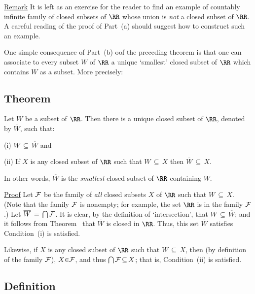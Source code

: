 {\V

        \underline{Remark} It is left as an exercise for the reader to find an example of countably infinite family of closed subsets of ${\RR}$ whose union is {\em not} a closed subset of ${\RR}$.
    A careful reading of the proof of Part~(a) should suggest how to construct such an example.

\V
\V

        One simple consequence of Part~(b) oof the preceding theorem is that one can associate to every subset $W$ of ${\RR}$ a unique `smallest' closed subset of ${\RR}$ which contains $W$ as a subset.
    More precisely:

            \subsection{\small{\bf Theorem}}
            \label{ThmC80.50}

        Let $W$ be a subset of ${\RR}$. Then there is a unique closed subset of ${\RR}$, denoted by $\overline{W}$, such that:

        (i) $W \,{\subseteq}\, \overline{W}$ and

        (ii) If $X$ is any closed subset of ${\RR}$ such that $W \,{\subseteq}\, X$ then $\overline{W} \,{\subseteq}\, X$.

\noindent In other words, $\overline{W}$ is the {\em smallest} closed subset of ${\RR}$ containing $W$.

\V

        \underline{Proof} Let ${\cal F}$ be the family of {\em all} closed subsets $X$ of ${\RR}$ such that $W \,{\subseteq}\, X$.
    (Note that the family ${\cal F}$ is nonempty; for example, the set ${\RR}$ is in the family ${\cal F}$.)
    Let $\overline{W} \,=\, {\bigcap}\, {\cal F}$. It is clear, by the definition of `intersection', that $W \,{\subseteq}\, {\overline{W}}$;
     and it follows from Theorem~ that $\overline{W}$ is closed in ${\RR}$.
    Thus, this set $\overline{W}$ satisfies Condition~(i) is satisfied.

        Likewise, if $X$ is any closed subset of ${\RR}$ such that $W \,{\subseteq}\, X$, then (by definition of the family ${\cal F}$), $X{\in}{\cal F}$, and thus ${\bigcap}\,{\cal F} \,{\subseteq}\, X$; that is, Condition~(ii) is satisfied.

\V

            \subsection{\small{\bf Definition}}
            \label{DefC80.60}

}
